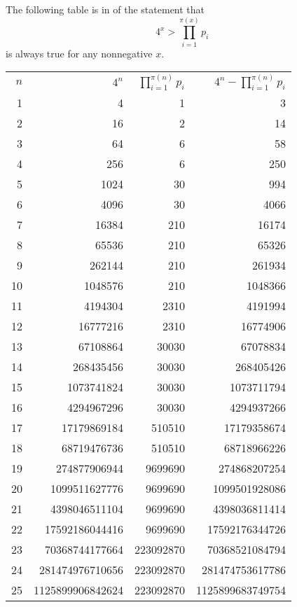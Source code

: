 \documentclass[12pt]{article}
\begin{document}
The following table is in  of the statement that $$4^x > \prod_{i = 1}^{\pi(x)} p_i$$ is always true for any nonnegative $x$.

\begin{tabular}{|r|r|r|r|}
$n$ & $4^n$ & $\displaystyle \prod_{i = 1}^{\pi(n)} p_i$ & $\displaystyle 4^n - \prod_{i = 1}^{\pi(n)} p_i$ \\
1 & 4 & 1 & 3 \\ 
2 & 16 & 2 & 14 \\ 
3 & 64 & 6 & 58 \\ 
4 & 256 & 6 & 250 \\ 
5 & 1024 & 30 & 994 \\ 
6 & 4096 & 30 & 4066 \\ 
7 & 16384 & 210 & 16174 \\ 
8 & 65536 & 210 & 65326 \\ 
9 & 262144 & 210 & 261934 \\ 
10 & 1048576 & 210 & 1048366 \\ 
11 & 4194304 & 2310 & 4191994 \\ 
12 & 16777216 & 2310 & 16774906 \\ 
13 & 67108864 & 30030 & 67078834 \\ 
14 & 268435456 & 30030 & 268405426 \\ 
15 & 1073741824 & 30030 & 1073711794 \\ 
16 & 4294967296 & 30030 & 4294937266 \\ 
17 & 17179869184 & 510510 & 17179358674 \\ 
18 & 68719476736 & 510510 & 68718966226 \\ 
19 & 274877906944 & 9699690 & 274868207254 \\ 
20 & 1099511627776 & 9699690 & 1099501928086 \\ 
21 & 4398046511104 & 9699690 & 4398036811414 \\ 
22 & 17592186044416 & 9699690 & 17592176344726 \\ 
23 & 70368744177664 & 223092870 & 70368521084794 \\ 
24 & 281474976710656 & 223092870 & 281474753617786 \\ 
25 & 1125899906842624 & 223092870 & 1125899683749754 \\
\end{tabular}
\end{document}
